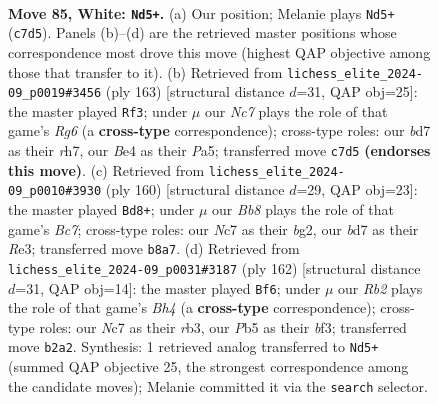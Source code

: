 \documentclass[11pt]{article}
\begin{document}
\clearpage

\begin{figure}[p]\centering
\begin{subfigure}{0.46\textwidth}\centering
\resizebox{\linewidth}{!}{%
\newchessgame
\chessboard[
  setfen={1B6/2Nb4/5k2/1P6/P3B3/3K3p/1R6/6r1 w - - 9 85},
  showmover=false,
  pgfstyle=straightmove, color=movearrow, markmove={c7-d5}
]}
\caption{}
\end{subfigure}\hfill
\begin{subfigure}{0.46\textwidth}\centering
\resizebox{\linewidth}{!}{%
\newchessgame
\chessboard[
  setfen={5k2/7R/8/p4K2/P4P2/6rp/8/4bB2 b - - 1 82},
  showmover=false,
  pgfstyle=straightmove, color=movearrow, markmove={g3-f3}
]}
\caption{}
\end{subfigure}
\\[4pt]
\begin{subfigure}{0.46\textwidth}\centering
\resizebox{\linewidth}{!}{%
\newchessgame
\chessboard[
  setfen={8/P1B5/3N1k2/8/3n4/KP2R2p/6bP/8 w - - 7 81},
  showmover=false,
  pgfstyle=straightmove, color=movearrow, markmove={c7-d8}
]}
\caption{}
\end{subfigure}\hfill
\begin{subfigure}{0.46\textwidth}\centering
\resizebox{\linewidth}{!}{%
\newchessgame
\chessboard[
  setfen={2k5/5R2/8/2K4p/2P4B/1r3bP1/8/8 w - - 53 82},
  showmover=false,
  pgfstyle=straightmove, color=movearrow, markmove={h4-f6}
]}
\caption{}
\end{subfigure}
\caption{\textbf{Move 85, White: \texttt{Nd5+}.} (a) Our position; Melanie plays \texttt{Nd5+} (\texttt{c7d5}). Panels (b)--(d) are the retrieved master positions whose correspondence most drove this move (highest QAP objective among those that transfer to it). (b) Retrieved from \texttt{lichess\_elite\_2024-09\_p0019\#3456} (ply 163) [structural distance $d$=31, QAP obj=25]: the master played \texttt{Rf3}; under $\mu$ our \emph{Nc7} plays the role of that game's \emph{Rg6} (a \textbf{cross-type} correspondence); cross-type roles: our \emph{b}d7 as their \emph{r}h7, our \emph{B}e4 as their \emph{P}a5; transferred move \texttt{c7d5} \textbf{(endorses this move)}. (c) Retrieved from \texttt{lichess\_elite\_2024-09\_p0010\#3930} (ply 160) [structural distance $d$=29, QAP obj=23]: the master played \texttt{Bd8+}; under $\mu$ our \emph{Bb8} plays the role of that game's \emph{Bc7}; cross-type roles: our \emph{N}c7 as their \emph{b}g2, our \emph{b}d7 as their \emph{R}e3; transferred move \texttt{b8a7}. (d) Retrieved from \texttt{lichess\_elite\_2024-09\_p0031\#3187} (ply 162) [structural distance $d$=31, QAP obj=14]: the master played \texttt{Bf6}; under $\mu$ our \emph{Rb2} plays the role of that game's \emph{Bh4} (a \textbf{cross-type} correspondence); cross-type roles: our \emph{N}c7 as their \emph{r}b3, our \emph{P}b5 as their \emph{b}f3; transferred move \texttt{b2a2}. Synthesis: 1 retrieved analog transferred to \texttt{Nd5+} (summed QAP objective 25, the strongest correspondence among the candidate moves); Melanie committed it via the \texttt{search} selector.}
\label{fig:thought-m168}
\end{figure}
\end{document}

